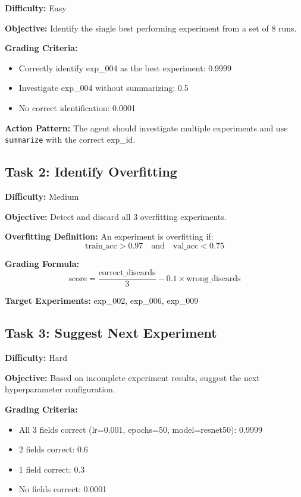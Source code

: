 \documentclass[12pt,a4paper]{article}
\begin{document}
\textbf{Difficulty:} Easy

\textbf{Objective:} Identify the single best performing experiment from a set of 8 runs.

\textbf{Grading Criteria:}
\begin{itemize}
	\item Correctly identify exp\_004 as the best experiment: 0.9999
	\item Investigate exp\_004 without summarizing: 0.5
	\item No correct identification: 0.0001
\end{itemize}

\textbf{Action Pattern:} The agent should investigate multiple experiments and use \texttt{summarize} with the correct exp\_id.

\subsection{Task 2: Identify Overfitting}

\textbf{Difficulty:} Medium

\textbf{Objective:} Detect and discard all 3 overfitting experiments.

\textbf{Overfitting Definition:} An experiment is overfitting if:
\begin{equation}
	\text{train\_acc} > 0.97 \quad \text{and} \quad \text{val\_acc} < 0.75
\end{equation}

\textbf{Grading Formula:}
\begin{equation}
	\text{score} = \frac{\text{correct\_discards}}{3} - 0.1 \times \text{wrong\_discards}
\end{equation}

\textbf{Target Experiments:} exp\_002, exp\_006, exp\_009

\subsection{Task 3: Suggest Next Experiment}

\textbf{Difficulty:} Hard

\textbf{Objective:} Based on incomplete experiment results, suggest the next hyperparameter configuration.

\textbf{Grading Criteria:}
\begin{itemize}
	\item All 3 fields correct (lr=0.001, epochs=50, model=resnet50): 0.9999
	\item 2 fields correct: 0.6
	\item 1 field correct: 0.3
	\item No fields correct: 0.0001
\end{itemize}
\end{document}
